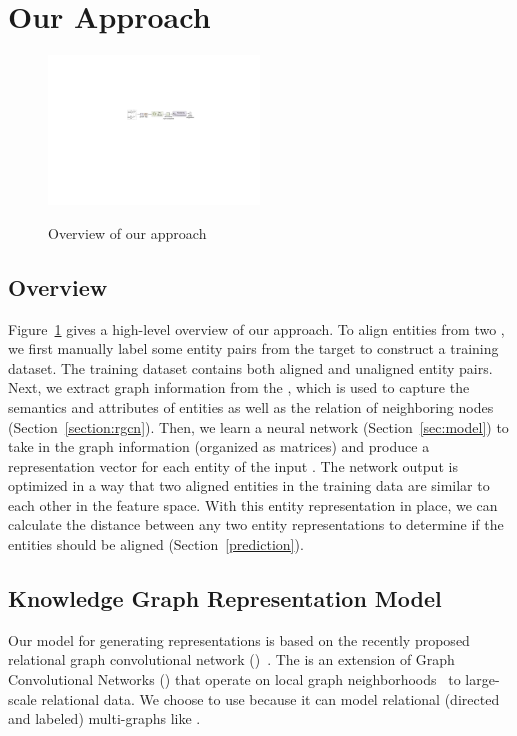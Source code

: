 \section{Our Approach}
	\label{section:app}
\begin{figure}
  \centering
  \includegraphics[width=0.5\textwidth]{figures/overview.pdf}\\
  \caption{Overview of our approach}\label{fig:overview}
\end{figure}

\subsection{Overview}
Figure~\ref{fig:overview} gives a high-level overview of our approach. To align entities from two \KGs, we first manually label some entity
pairs from the target \KGs to construct a training dataset. The training dataset contains both aligned and unaligned entity pairs. Next, we
extract graph information from the \KGs, which is used to capture the semantics and attributes of entities as well as the relation of
neighboring nodes (Section~\ref{section:rgcn}). Then, we learn a neural network (Section~\ref{sec:model}) to take in the graph information
(organized as matrices) and produce a representation vector for each entity of the input \KGs. The network output is optimized in a way
that two aligned entities in the training data are similar to each other in the feature space. With this entity representation in place, we
can calculate the distance between any two entity representations to determine if the entities should be aligned
(Section~\ref{prediction}).

	

	
    \subsection{Knowledge Graph Representation Model\label{sec:model}}
    Our model for generating \KG representations  is based on the recently proposed relational graph convolutional network (\RGCN)~\cite{Schlichtkrull2017Modeling}.
    The \RGCN is an extension of Graph Convolutional Networks (\GCNs) that operate on local graph neighborhoods~\cite{Duvenaud2015Convolutional,Kipf2016Semi} to large-scale relational data.
    We choose to use \RGCN because it can model relational (directed and labeled) multi-graphs like \KGs.

